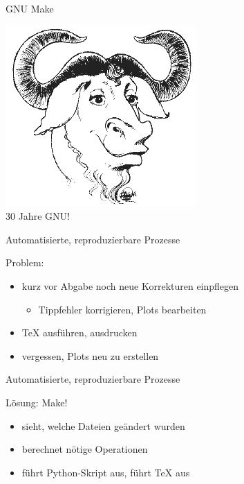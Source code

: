 
\begin{frame}{GNU Make}
  \begin{center}
    \includegraphics[scale=0.5]{logos/gnu.png} \\
    \Huge 30 Jahre GNU!
  \end{center}
\end{frame}

\begin{frame}{Automatisierte, reproduzierbare Prozesse}

  {\huge Problem:}
  \vspace{1em}
  \begin{itemize}
    \item kurz vor Abgabe noch neue Korrekturen einpflegen
      \begin{itemize}
        \item Tippfehler korrigieren, Plots bearbeiten
      \end{itemize}
    \item \TeX{} ausführen, ausdrucken
    \item vergessen, Plots neu zu erstellen
  \end{itemize}
\end{frame}

\begin{frame}{Automatisierte, reproduzierbare Prozesse}

  {\huge Lösung: Make!}
  \vspace{1em}
  \begin{itemize}
    \item sieht, welche Dateien geändert wurden
    \item berechnet nötige Operationen
    \item führt Python-Skript aus, führt \TeX{} aus
  \end{itemize}
\end{frame}

